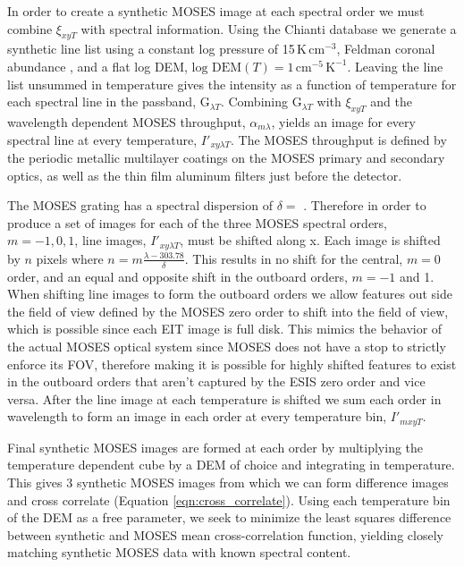 		In order to create a synthetic MOSES image at each spectral order we must combine $\xi_{xyT}$ with spectral information.
		Using the Chianti database we generate a synthetic line list using a constant log pressure of 15\,K\,cm$^{-3}$, Feldman coronal abundance \citep{FeldmanAbund}, and a flat log DEM, $\text{log DEM}(T) = 1\,\text{cm}^{-5}\,\text{K}^{-1}$.
		Leaving the line list unsummed in temperature gives the intensity as a function of temperature for each spectral line in the passband, G$_{\lambda T}$.
		Combining G$_{\lambda T}$ with $\xi_{xyT}$ and the wavelength dependent MOSES throughput, $\alpha_{m\lambda}$, yields an image for every spectral line at every temperature, $I'_{xy\lambda T}$.
		The MOSES throughput is defined by the periodic metallic multilayer coatings on the MOSES primary and secondary optics, as well as the thin film aluminum filters just before the detector.
		
		The MOSES grating has a spectral dispersion of $\delta =$ \spectdisperspix.
		Therefore in order to produce a set of images for each of the three MOSES spectral orders, $m = -1,0,1$, line images, $I'_{xy\lambda T}$, must be shifted along x.
		Each image is shifted by $n$ pixels where $n = m\frac{\lambda - 303.78}{\delta}$.
		This results in no shift for the central, $m = 0$ order, and an equal and opposite shift in the outboard orders, $m = -1$ and 1.
		When shifting line images to form the outboard orders we allow features out side the field of view defined by the MOSES zero order to shift into the field of view, which is possible since each EIT image is full disk.
		This mimics the behavior of the actual MOSES optical system since MOSES does not have a stop to strictly enforce its FOV, therefore making it is possible for highly shifted features to exist in the outboard orders that aren't captured by the ESIS zero order and vice versa.
		After the line image at each temperature is shifted we sum each order in wavelength to form an image in each order at every temperature bin, $I'_{mxyT}$.
		     	
		Final synthetic MOSES images are formed at each order by multiplying the temperature dependent cube by a DEM of choice and integrating in temperature.
		This gives 3 synthetic MOSES images from which we can form difference images and cross correlate (Equation \ref{eqn:cross_correlate}).
		Using each temperature bin of the DEM as a free parameter, we seek to minimize the least squares difference between synthetic and MOSES mean cross-correlation function, yielding closely matching synthetic MOSES data with known spectral content.
		
